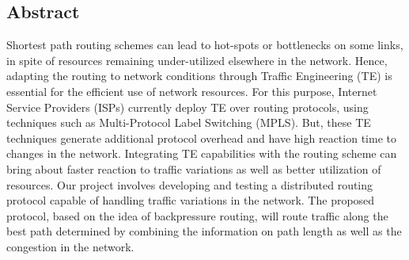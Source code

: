 \label{sec:abstract}
\begin{center}
\section*{Abstract}
\end{center}

Shortest path routing schemes can lead to hot-spots or bottlenecks on some links, in spite of resources remaining under-utilized elsewhere in the network. Hence, adapting the routing to network conditions through Traffic Engineering (TE) is essential for the efficient use of network resources. For this purpose, Internet Service Providers (ISPs) currently deploy TE over routing protocols, using techniques such as Multi-Protocol Label Switching (MPLS). But, these TE techniques generate additional protocol overhead and have high reaction time to changes in the network. Integrating TE capabilities with the routing scheme can bring about faster reaction to traffic variations as well as better utilization of resources. Our project involves developing and testing a distributed routing protocol capable of handling traffic variations in the network. The proposed protocol, based on the idea of backpressure routing, will route traffic along the best path determined by combining the information on path length as well as the congestion in the network.
